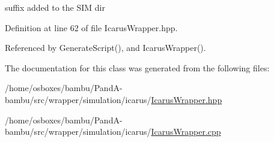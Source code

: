 suffix added to the S\+IM dir 



Definition at line 62 of file Icarus\+Wrapper.\+hpp.



Referenced by Generate\+Script(), and Icarus\+Wrapper().



The documentation for this class was generated from the following files\+:\begin{DoxyCompactItemize}
\item 
/home/osboxes/bambu/\+Pand\+A-\/bambu/src/wrapper/simulation/icarus/\hyperlink{IcarusWrapper_8hpp}{Icarus\+Wrapper.\+hpp}\item 
/home/osboxes/bambu/\+Pand\+A-\/bambu/src/wrapper/simulation/icarus/\hyperlink{IcarusWrapper_8cpp}{Icarus\+Wrapper.\+cpp}\end{DoxyCompactItemize}
